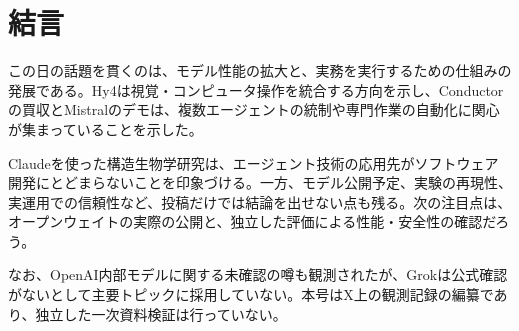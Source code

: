 \section{結言}
この日の話題を貫くのは、モデル性能の拡大と、実務を実行するための仕組みの発展である。Hy4は視覚・コンピュータ操作を統合する方向を示し、Conductorの買収とMistralのデモは、複数エージェントの統制や専門作業の自動化に関心が集まっていることを示した。

Claudeを使った構造生物学研究は、エージェント技術の応用先がソフトウェア開発にとどまらないことを印象づける。一方、モデル公開予定、実験の再現性、実運用での信頼性など、投稿だけでは結論を出せない点も残る。次の注目点は、オープンウェイトの実際の公開と、独立した評価による性能・安全性の確認だろう。

なお、OpenAI内部モデルに関する未確認の噂も観測されたが、Grokは公式確認がないとして主要トピックに採用していない。本号はX上の観測記録の編纂であり、独立した一次資料検証は行っていない。
